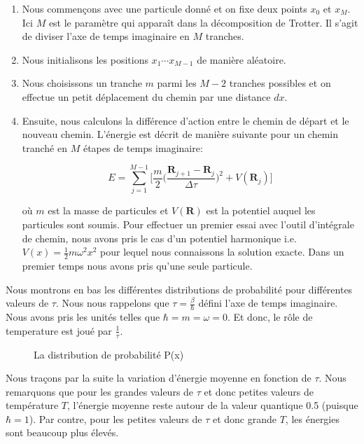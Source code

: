 \documentclass[11pt]{article}
\theoremstyle{definition}
\theoremstyle{remark}
\begin{document}
\begin{enumerate} 
\item 
Nous commençons avec une particule donné et on fixe deux points $x_0$ et $x_M$. Ici $M$ est le paramètre qui apparaît dans la décomposition de Trotter. Il s'agit de diviser l'axe de temps imaginaire en $M$ tranches. 
\item 
Nous initialisons les positions $x_1 \cdots x_{M-1}$ de manière aléatoire. 
\item 
Nous choisissons un tranche $m$ parmi les $M-2$ tranches possibles et on effectue un petit déplacement du chemin par une distance $dx$. 
\item 
Ensuite, nous calculons la différence d'action entre le chemin de départ et le nouveau chemin. L’énergie est décrit de manière suivante pour un chemin tranché en $M$ étapes de temps imaginaire:

\begin{equation} 
\label{energie_trotter}
E = \sum_{j=1}^{M-1}\Big[ \frac{m}{2} \Big( \frac{\mathbf{R}_{j+1} - \mathbf{R}_j}{\Delta \tau}\Big)^2  + V(\mathbf{R}_j) \Big]
\end{equation}

où $m$ est la masse de particules et $V(\mathbf{R})$ est la potentiel auquel les particules sont soumis. Pour effectuer un premier essai avec l'outil d’intégrale de chemin, nous avons pris le cas d'un potentiel harmonique i.e. $V(x) = \frac{1}{2} m \omega^2 x^2$ pour lequel nous connaissons la solution exacte. Dans un premier temps nous avons pris qu'une seule particule. 
\end{enumerate}

Nous montrons en bas les différentes distributions de probabilité pour différentes valeurs de $\tau$. Nous nous rappelons que $\tau = \frac{\beta}{\hbar}$ défini l'axe de temps imaginaire. Nous avons pris les unités telles que $\hbar = m = \omega = 0$. Et donc, le rôle de temperature est joué par $\frac{1}{\tau}$. 

\begin{figure}[!h]
\centering

\caption{La distribution de probabilité P(x)}
\end{figure}

Nous traçons par la suite la variation d’énergie moyenne en fonction de $\tau$. Nous remarquons que pour les grandes valeurs de $\tau$ et donc petites valeurs de température $T$, l’énergie moyenne reste autour de la valeur quantique 0.5 (puisque $\hbar=1$). Par contre, pour les petites valeurs de $\tau$ et donc grande $T$, les énergies sont beaucoup plus élevés. 
\end{document}
